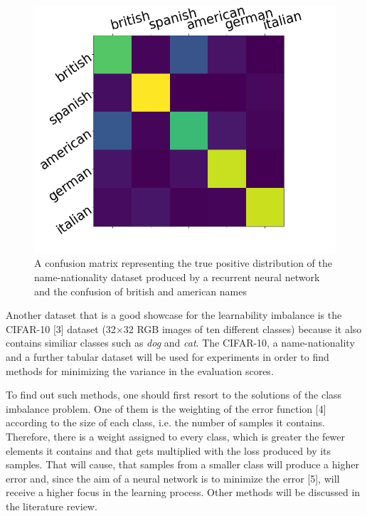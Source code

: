 \documentclass[journal]{IEEEtran}
\begin{document}
\begin{figure}[h!]
        \includegraphics[width=\linewidth]{images/Figure_1.png}
        \caption{A confusion matrix representing the true positive distribution of the name-nationality dataset produced by a recurrent neural network and the confusion of british and american names}
        \label{fig:tp_scores}
\end{figure}

Another dataset that is a good showcase for the learnability imbalance is the CIFAR-10 [3] dataset (32$\times$32 RGB images of ten different classes) because it also contains similiar classes such as \emph{dog} and \emph{cat}.
The CIFAR-10, a name-nationality and a further tabular dataset will be used for experiments in order to find methods for minimizing the variance in the evaluation scores.

To find out such methods, one should first resort to the solutions of the class imbalance problem.
One of them is the weighting of the error function [4] according to the size of each class, i.e. the number of samples it contains.
Therefore, there is a weight assigned to every class, which is greater the fewer elements it contains and that gets multiplied with the loss produced by its samples. %
That will cause, that samples from a smaller class will produce a higher error and, since the aim of a neural network is to minimize the error [5], will receive a higher focus in the learning process.
Other methods will be discussed in the literature review.
\end{document}
